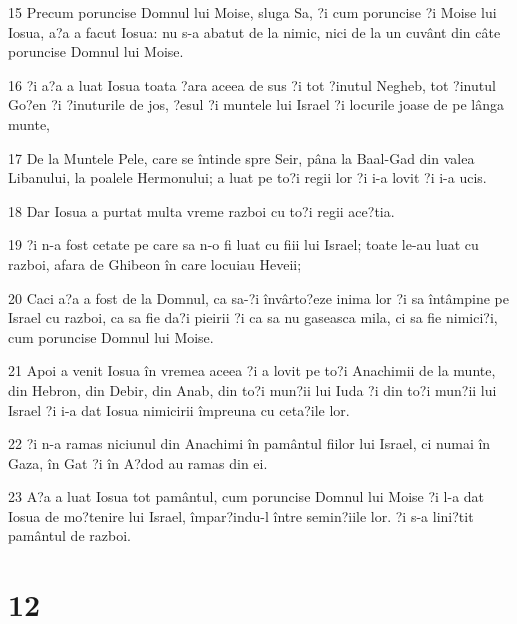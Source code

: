 \par 15 Precum poruncise Domnul lui Moise, sluga Sa, ?i cum poruncise ?i Moise lui Iosua, a?a a facut Iosua: nu s-a abatut de la nimic, nici de la un cuvânt din câte poruncise Domnul lui Moise.
\par 16 ?i a?a a luat Iosua toata ?ara aceea de sus ?i tot ?inutul Negheb, tot ?inutul Go?en ?i ?inuturile de jos, ?esul ?i muntele lui Israel ?i locurile joase de pe lânga munte,
\par 17 De la Muntele Pele, care se întinde spre Seir, pâna la Baal-Gad din valea Libanului, la poalele Hermonului; a luat pe to?i regii lor ?i i-a lovit ?i i-a ucis.
\par 18 Dar Iosua a purtat multa vreme razboi cu to?i regii ace?tia.
\par 19 ?i n-a fost cetate pe care sa n-o fi luat cu fiii lui Israel; toate le-au luat cu razboi, afara de Ghibeon în care locuiau Heveii;
\par 20 Caci a?a a fost de la Domnul, ca sa-?i învârto?eze inima lor ?i sa întâmpine pe Israel cu razboi, ca sa fie da?i pieirii ?i ca sa nu gaseasca mila, ci sa fie nimici?i, cum poruncise Domnul lui Moise.
\par 21 Apoi a venit Iosua în vremea aceea ?i a lovit pe to?i Anachimii de la munte, din Hebron, din Debir, din Anab, din to?i mun?ii lui Iuda ?i din to?i mun?ii lui Israel ?i i-a dat Iosua nimicirii împreuna cu ceta?ile lor.
\par 22 ?i n-a ramas niciunul din Anachimi în pamântul fiilor lui Israel, ci numai în Gaza, în Gat ?i în A?dod au ramas din ei.
\par 23 A?a a luat Iosua tot pamântul, cum poruncise Domnul lui Moise ?i l-a dat Iosua de mo?tenire lui Israel, împar?indu-l între semin?iile lor. ?i s-a lini?tit pamântul de razboi.

\chapter{12}

